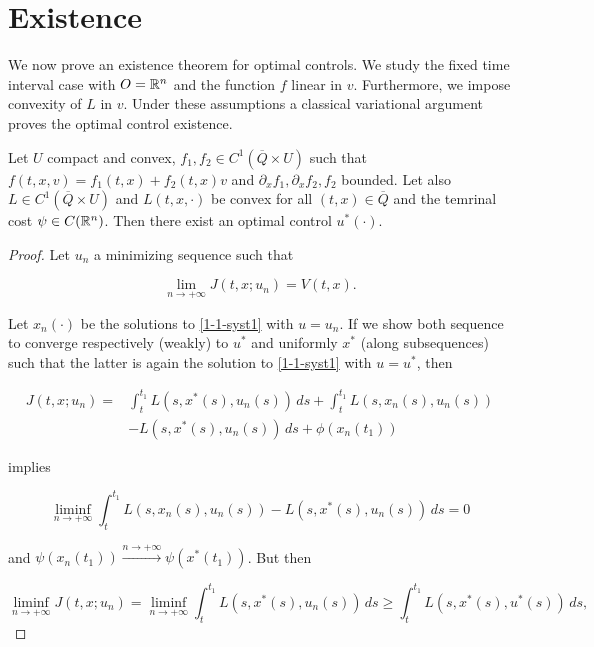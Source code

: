 \section{Existence}

We now prove an existence theorem for optimal controls.
We study the fixed time interval case with $O=\mathbb{R}^n$ and the function $f$ linear in $v$.
Furthermore, we impose convexity of $L$ in $v$. Under these assumptions a classical variational
argument proves the optimal control existence.
\begin{theorem}
    Let $U$ compact and convex, $f_1,f_2\in C^1(\overline{Q}\times U)$ such that $f(t,x,v)=f_1(t,x)+f_2(t,x)v$ and $\partial_xf_{1},\partial_xf_2,f_2$ bounded.
    Let also $L\in C^1(\overline{Q}\times U)$ and $L(t,x,\cdot)$ be convex for all $(t,x)\in\overline{Q}$ and the temrinal cost $\psi\in C(\mathbb{R}^n)$. Then there exist an optimal control $u^{\ast}(\cdot)$.

    \begin{proof}
        Let $u_n$ a minimizing sequence such that

        \begin{equation}
            \lim_{n\to+\infty} J(t,x;u_n) = V(t,x).
        \end{equation}

        Let $x_n(\cdot)$ be the solutions to \eqref{1-1-syst1} with $u=u_n$. If we show both sequence to converge respectively 
        (weakly) to $u^{\ast}$ and uniformly $x^{\ast}$ (along subsequences) such that the latter is again the solution to \eqref{1-1-syst1} with $u=u^{\ast}$, then

        \begin{align*}
            J(t,x;u_n) = & \int_t^{t_1} L(s,x^{\ast}(s),u_n(s)) \,ds + \int_t^{t_1} L(s,x_n(s),u_n(s)) \\
            & - L(s,x^{\ast}(s),u_n(s)) \,ds + \phi(x_n(t_1))
        \end{align*}

        implies

        \[\liminf_{n\to+\infty} \int_t^{t_1} L(s,x_n(s),u_n(s)) - L(s,x^{\ast}(s),u_n(s)) \,ds = 0\]

        and $\psi(x_n(t_1))\xrightarrow{n\to+\infty}\psi(x^{\ast}(t_1))$. But then

        \begin{equation}\label{1-4-existenceliminf}
            \liminf_{n\to+\infty} J(t,x;u_n) = \liminf_{n\to+\infty} \int_t^{t_1} L(s,x^{\ast}(s),u_n(s)) \,ds \geq \int_t^{t_1} L(s,x^{\ast}(s),u^{\ast}(s)) \,ds, 
        \end{equation}


\end{proof}
\end{theorem}
